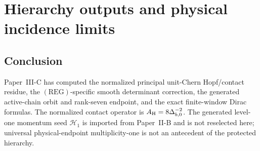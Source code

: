 \documentclass[12pt,a4paper]{article}
\begin{document}
\section{Hierarchy outputs and physical incidence limits}
\label{paper3c:sec:organized-conclusion}
\subsection{Conclusion}
\label{p3c:sec:conclusion}
Paper~III-C has computed the normalized principal unit-Chern Hopf/contact residue, the
\((\mathrm{REG})\)-specific smooth determinant correction, the generated
active-chain orbit and rank-seven endpoint, and the exact finite-window Dirac formulas.
The normalized contact operator is
\(A_{\rm H}=8\Delta_{b,0}^{-2}\).  The generated level-one momentum seed \(\mathcal H_1\) is imported
from Paper~II-B and is not reselected here; universal physical-endpoint
multiplicity-one is not an antecedent of the protected hierarchy.
\end{document}
